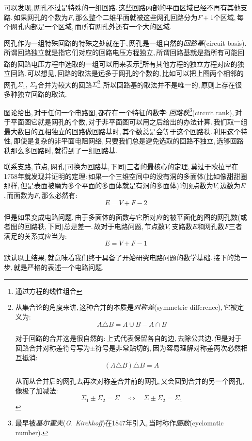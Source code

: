 可以发现,\,网孔不过是特殊的一组回路.\,这些回路内部的平面区域已经不再有其他支路.\,如果网孔的个数为$F$,\,那么整个二维平面就被这些网孔回路分为$F+1$个区域,\,每个网孔内部是一个区域,\,而所有网孔外还有一个大的区域.

网孔作为一组特殊回路的特殊之处就在于,\,网孔是一组自然的\emph{回路基}(circuit basis).\,所谓回路独立就是指它们对应的回路电压方程独立,\,所谓回路基就是指所有可能回路的回路电压方程中选取的一组可以用来表示\footnote{通过方程的线性组合}所有其他方程的独立方程对应的独立回路.\,可以想见,\,回路的取法是远多于网孔的个数的,\,比如可以把上图两个相邻的网孔$\Sigma_1,\,\Sigma_2$合并为较大的回路$\Sigma$\footnote{从集合论的角度来讲,\,这种合并的本质是\emph{对称差}(symmetric difference),\,它被定义为:
\[A\triangle B=A\cup B-A\cap B\]

对于回路的合并这是很自然的:\,上式代表保留各自的边,\,去除公共边.\,但是对于回路合并对称差符号写为$\pm$符号是非常贴切的,\,因为容易理解对称差两次必然相互抵消:
\[(A\triangle B)\triangle B=A\]

从而从合并后的网孔去再次对称差合并前的网孔,\,又会回到合并的另一个网孔,\,像极了加减法:
\[\Sigma_1\pm \Sigma_2=\Sigma \quad \Leftrightarrow \quad \Sigma \pm \Sigma_2=\Sigma_1\]
}.\,所以回路基的取法并不是唯一的,\,原则上存在很多种独立回路的取法.

图论给出,\,对于任何一个电路图,\,都存在一个特征的数字:\,\emph{回路秩}\footnote{最早被\emph{基尔霍夫}({\it G. Kirchhoff})在1847年引入,\,当时称作\emph{圈数}(cyclomatic number).}(circuit rank),\,对于平面图它就是网孔的个数,\,对于非平面图可以用之后给出的办法计算.\,我们取一组最大数目的互相独立的回路做回路基时,\,其个数总是会等于这个回路秩.\,利用这个特性,\,即使是复杂的非平面电阻网络,\,只要我们总是避免选取的回路不独立,\,选够回路秩那么多回路时,\,就得到了一组回路基.

\vspace{1cm}

联系支路,\,节点,\,网孔(可换为回路基,\,下同)三者的最核心的定理,\,莫过于欧拉早在1758年就发现并证明的定理:\,如果一个三维空间中的没有洞的多面体(比如像甜甜圈那样,\,但是表面被磨为多个平面的多面体就是有洞的多面体)的顶点数为$V$,\,边数为$E$,\,而面数为$F$,\,那么必然有:
\[E=V+F-2\]

但是如果变成电路问题,\,由于多面体的面数与它所对应的被平面化的图的网孔数(或者图的回路秩,\,下同)总是差一.\,故对于电路问题,\,节点数$V$,\,支路数$E$和网孔数$F$三者满足的关系式应当为:
\[E=V+F-1\]

默认以上结果,\,就意味着我们终于具备了开始研究电路问题的数学基础.\,接下的第一步,\,就是严格的表述一个电路问题.


